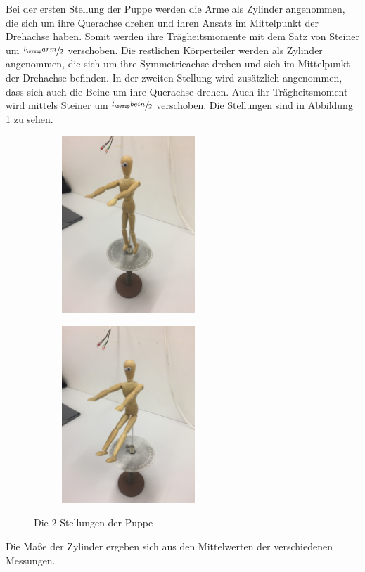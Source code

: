Bei der ersten Stellung der Puppe werden die Arme als Zylinder angenommen, die sich um
ihre Querachse drehen und ihren Ansatz im Mittelpunkt der Drehachse haben. Somit werden
ihre Trägheitsmomente mit dem Satz von Steiner um $\sfrac{l_\su{arm}}{2}$ verschoben.
Die restlichen Körperteiler werden als Zylinder angenommen, die sich um ihre Symmetrieachse
drehen und sich im Mittelpunkt der Drehachse befinden.
In der zweiten Stellung wird zusätzlich angenommen, dass sich auch die Beine um ihre
Querachse drehen. Auch ihr Trägheitsmoment wird mittels Steiner um $\sfrac{l_\su{bein}}{2}$
verschoben. Die Stellungen sind in Abbildung \ref{fig:stellung} zu sehen.
\begin{figure}
  \centering
  \begin{subfigure}{0.48\textwidth}
    \includegraphics[width=5cm]{bilder/stellung1.JPG}
  \end{subfigure}
  \begin{subfigure}{0.48\textwidth}
    \includegraphics[width=5cm]{bilder/stellung2.JPG}
  \end{subfigure}
  \caption{Die 2 Stellungen der Puppe}
  \label{fig:stellung}
\end{figure}
Die Maße der Zylinder ergeben sich aus den Mittelwerten der verschiedenen Messungen.
